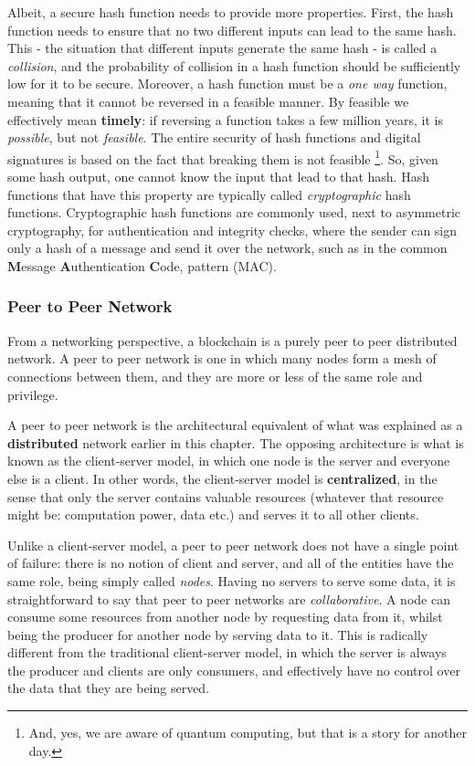 Albeit, a secure hash function needs to provide more properties. First, the hash function needs to
ensure that no two different inputs can lead to the same hash. This - the situation that different
inputs generate the same hash - is called a \textit{collision}, and the probability of collision in
a hash function should be sufficiently low for it to be secure. Moreover, a hash function must be a
\textit{one way} function, meaning that it cannot be reversed in a feasible manner. By feasible we
effectively mean \textbf{timely}: if reversing a function takes a few million years, it is
\textit{possible}, but not \textit{feasible}. The entire security of hash functions and digital
signatures is based on the fact that breaking them is not feasible \footnote{And, yes, we are aware
of quantum computing, but that is a story for another day.}. So, given some hash output, one cannot
know the input that lead to that hash. Hash functions that have this property are typically called
\textit{cryptographic} hash functions. Cryptographic hash functions are commonly used, next to
asymmetric cryptography, for authentication and integrity checks, where the sender can sign only a
hash of a message and send it over the network, such as in the common \textbf{M}essage
\textbf{A}uthentication \textbf{C}ode, pattern \cite{bellareKeyingHashFunctions1996} (MAC).

\subsubsection{Peer to Peer Network} \label{chap_bg:subsec:p2p}

From a networking perspective, a blockchain is a purely peer to peer distributed network. A peer to
peer network is one in which many nodes form a mesh of connections between them, and they are more
or less of the same role and privilege.

A peer to peer network is the architectural equivalent of what was explained as a
\textbf{distributed} network earlier in this chapter. The opposing architecture is what is known as
the client-server model, in which one node is the server and everyone else is a client. In other
words, the client-server model is \textbf{centralized}, in the sense that only the server contains
valuable resources (whatever that resource might be: computation power, data etc.) and serves it to
all other clients.

Unlike a client-server model, a peer to peer network does not have a single point of failure: there
is no notion of client and server, and all of the entities have the same role, being simply called
\textit{nodes}. Having no servers to serve some data, it is straightforward to say that peer to peer
networks are \textit{collaborative}. A node can consume some resources from another node by
requesting data from it, whilst being the producer for another node by serving data to it. This is
radically different from the traditional client-server model, in which the server is always the
producer and clients are only consumers, and effectively have no control over the data that they are
being served.


